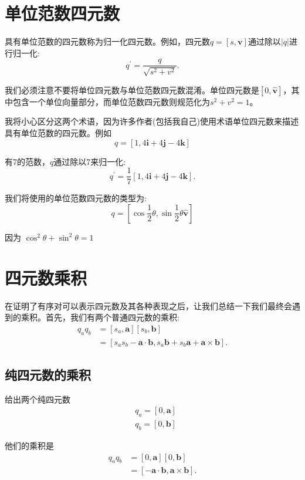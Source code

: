 \section{单位范数四元数}
具有单位范数的四元数称为归一化四元数。例如，四元数$q=[s, \mathbf{v}]$通过除以$|q|$进行归一化:
$$
q^{\prime}=\frac{q}{\sqrt{s^{2}+v^{2}}} .
$$

我们必须注意不要将单位四元数与单位范数四元数混淆。单位四元数是$[0,\hat{\mathbf{v}}]$，其中包含一个单位向量部分，而单位范数四元数则规范化为$s^{2}+v^{2}=1$。

我将小心区分这两个术语，因为许多作者(包括我自己)使用术语单位四元数来描述具有单位范数的四元数。例如
$$
q=[1,4 \mathbf{i}+4 \mathbf{j}-4 \mathbf{k}]
$$

有7的范数，$q$通过除以7来归一化:
$$
q^{\prime}=\frac{1}{7}[1,4 \mathbf{i}+4 \mathbf{j}-4 \mathbf{k}] .
$$

我们将使用的单位范数四元数的类型为:
$$
q=\left[\cos \frac{1}{2} \theta, \sin \frac{1}{2} \theta \hat{\mathbf{v}}\right]
$$

因为 $\cos ^{2} \theta+\sin ^{2} \theta=1$

\section{四元数乘积}
在证明了有序对可以表示四元数及其各种表现之后，让我们总结一下我们最终会遇到的乘积。首先，我们有两个普通四元数的乘积:
$$
\begin{aligned}
q_{a} q_{b} & =\left[s_{a}, \mathbf{a}\right]\left[s_{b}, \mathbf{b}\right] \\
& =\left[s_{a} s_{b}-\mathbf{a} \cdot \mathbf{b}, s_{a} \mathbf{b}+s_{b} \mathbf{a}+\mathbf{a} \times \mathbf{b}\right] .
\end{aligned}
$$

\subsection{纯四元数的乘积}
给出两个纯四元数
$$
\begin{aligned}
& q_{a}=[0, \mathbf{a}] \\
& q_{b}=[0, \mathbf{b}]
\end{aligned}
$$

他们的乘积是
$$
\begin{aligned}
q_{a} q_{b} & =[0, \mathbf{a}][0, \mathbf{b}] \\
& =[-\mathbf{a} \cdot \mathbf{b}, \mathbf{a} \times \mathbf{b}] .
\end{aligned}
$$

